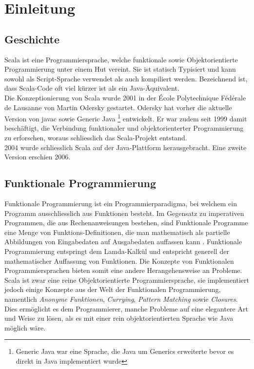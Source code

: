 \chapter{Einleitung}

\section{Geschichte}

Scala ist eine Programmiersprache, welche funktionale sowie
Objektorientierte Programmierung unter einem Hut vereint. Sie ist statisch
Typisiert und kann sowohl als Script-Sprache verwendet als auch kompiliert
werden. Bezeichnend ist, dass Scala-Code oft viel kürzer ist als ein
Java-Äquivalent.\\

Die Konzeptionierung von Scala wurde 2001 in der École Polytechnique
Fédérale de Lausanne von Martin Odersky gestartet. Odersky hat
vorher die aktuelle Version von javac sowie Generic Java 
\footnote{Generic Java war eine Sprache, die Java um Generics erweiterte
bevor es direkt in Java implementiert wurde}
entwickelt. Er war zudem seit 1999 damit beschäftigt, die Verbindung
funktionaler und objektorienterter Programmierung zu erforschen, woraus
schliesslich das Scala-Projekt entstand. \\

2004 wurde schliesslich Scala auf der Java-Plattform herausgebracht. Eine
zweite Version erschien 2006.

\section{Funktionale Programmierung}

Funktionale Programmierung ist ein Programmierparadigma, bei welchem
ein Programm ausschliesslich aus Funktionen besteht. Im Gegensatz
zu imperativen Programmen, die aus Rechenanweisungen bestehen, sind
Funktionale Programme eine Menge von Funktions-Definitionen, die man
mathematisch als partielle Abbildungen von Eingabedaten auf Ausgabedaten
auffassen kann \cite{wikipediaFunktional}. Funktionale Programmierung
entspringt dem Lamda-Kalkül und entspricht generell der mathematischer
Auffassung von Funktionen. Die Konzepte von Funktionalen
Programmiersprachen bieten somit eine andere Herangehensweise an Probleme.\\

Scala ist zwar eine reine Objektorientierte Programmiersprache, sie
implementiert jedoch einige Konzepte aus der Welt der Funktionalen
Programmierung, namentlich \emph{Anonyme Funktionen}, \emph{Currying},
\emph{Pattern Matching} sowie \emph{Closures}. Dies ermöglicht es
dem Programmierer, manche Probleme auf eine elegantere Art und Weise
zu lösen, als es mit einer rein objektorientierten Sprache wie Java
möglich wäre.

